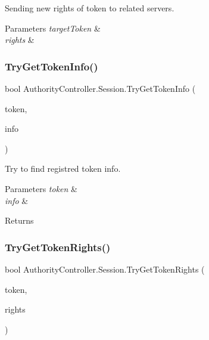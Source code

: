 Sending new rights of token to related servers. 


\begin{DoxyParams}{Parameters}
{\em target\+Token} & \\
\hline
{\em rights} & \\
\hline
\end{DoxyParams}
\mbox{\label{class_authority_controller_1_1_session_abdd6c48f989b28cc9b3838dbe569edc6}} 
\subsubsection{\texorpdfstring{Try\+Get\+Token\+Info()}{TryGetTokenInfo()}}
{\footnotesize\ttfamily bool Authority\+Controller.\+Session.\+Try\+Get\+Token\+Info (\begin{DoxyParamCaption}\item[{string}]{token,  }\item[{out \mbox{\hyperlink{class_authority_controller_1_1_data_1_1_temporal_1_1_token_info}{Token\+Info}}}]{info }\end{DoxyParamCaption})}



Try to find registred token info. 


\begin{DoxyParams}{Parameters}
{\em token} & \\
\hline
{\em info} & \\
\hline
\end{DoxyParams}
\begin{DoxyReturn}{Returns}

\end{DoxyReturn}
\mbox{\label{class_authority_controller_1_1_session_a37157e74e3aee082b7adfb906ec69511}} 
\subsubsection{\texorpdfstring{Try\+Get\+Token\+Rights()}{TryGetTokenRights()}}
{\footnotesize\ttfamily bool Authority\+Controller.\+Session.\+Try\+Get\+Token\+Rights (\begin{DoxyParamCaption}\item[{string}]{token,  }\item[{out string \mbox{[}$\,$\mbox{]}}]{rights }\end{DoxyParamCaption})}



